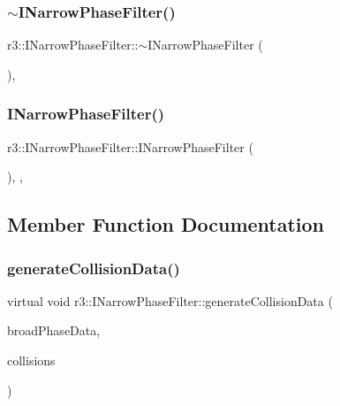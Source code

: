 \subsubsection{\texorpdfstring{$\sim$\+I\+Narrow\+Phase\+Filter()}{~INarrowPhaseFilter()}}
{\footnotesize\ttfamily r3\+::\+I\+Narrow\+Phase\+Filter\+::$\sim$\+I\+Narrow\+Phase\+Filter (\begin{DoxyParamCaption}{ }\end{DoxyParamCaption})\hspace{0.3cm}{\ttfamily [virtual]}, {\ttfamily [default]}}

\mbox{\label{classr3_1_1_i_narrow_phase_filter_a48c0812ce04a7e258c8fbbf34c8b85a6}} 
\subsubsection{\texorpdfstring{I\+Narrow\+Phase\+Filter()}{INarrowPhaseFilter()}}
{\footnotesize\ttfamily r3\+::\+I\+Narrow\+Phase\+Filter\+::\+I\+Narrow\+Phase\+Filter (\begin{DoxyParamCaption}{ }\end{DoxyParamCaption})\hspace{0.3cm}{\ttfamily [explicit]}, {\ttfamily [protected]}, {\ttfamily [default]}}



\subsection{Member Function Documentation}
\mbox{\label{classr3_1_1_i_narrow_phase_filter_a800e26eea0b0a899cde273e2931c22db}} 
\subsubsection{\texorpdfstring{generate\+Collision\+Data()}{generateCollisionData()}}
{\footnotesize\ttfamily virtual void r3\+::\+I\+Narrow\+Phase\+Filter\+::generate\+Collision\+Data (\begin{DoxyParamCaption}\item[{const \mbox{\hyperlink{classr3_1_1_fixed_size_container}{Fixed\+Size\+Container}}$<$ \mbox{\hyperlink{classr3_1_1_collision_pair}{Collision\+Pair}} $>$ \&}]{broad\+Phase\+Data,  }\item[{\mbox{\hyperlink{classr3_1_1_collision_data}{Collision\+Data}} \&}]{collisions }\end{DoxyParamCaption})\hspace{0.3cm}{\ttfamily [pure virtual]}}



